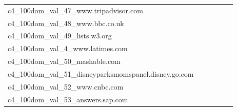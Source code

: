 {\begin{longtable}{m{6cm}m{1.7cm}m{1.7cm}m{1.7cm}m{1.7cm}m{1.7cm}}
	c4\_100dom\_val\_47\_www.tripadvisor.com  & \colorbox[HTML]{ffffe5}{\makebox[\mywidth][c]{15.80}} & \colorbox[HTML]{f7fcbb}{\makebox[\mywidth][c]{15.26}} & \colorbox[HTML]{ffffe5}{\makebox[\mywidth][c]{16.26}} & \colorbox[HTML]{d9f0a3}{\makebox[\mywidth][c]{15.10}} & \colorbox[HTML]{77c578}{\makebox[\mywidth][c]{14.93}}\\
	c4\_100dom\_val\_48\_www.bbc.co.uk  & \colorbox[HTML]{fefee3}{\makebox[\mywidth][c]{12.55}} & \colorbox[HTML]{f2fab5}{\makebox[\mywidth][c]{12.10}} & \colorbox[HTML]{ffffe5}{\makebox[\mywidth][c]{13.02}} & \colorbox[HTML]{daf0a4}{\makebox[\mywidth][c]{12.00}} & \colorbox[HTML]{77c578}{\makebox[\mywidth][c]{11.85}}\\
	c4\_100dom\_val\_49\_lists.w3.org  & \colorbox[HTML]{fdfedc}{\makebox[\mywidth][c]{18.75}} & \colorbox[HTML]{edf8b2}{\makebox[\mywidth][c]{18.24}} & \colorbox[HTML]{ffffe5}{\makebox[\mywidth][c]{19.89}} & \colorbox[HTML]{cae99c}{\makebox[\mywidth][c]{18.05}} & \colorbox[HTML]{77c578}{\makebox[\mywidth][c]{17.84}}\\
	c4\_100dom\_val\_4\_www.latimes.com  & \colorbox[HTML]{fefee2}{\makebox[\mywidth][c]{11.88}} & \colorbox[HTML]{ebf7b0}{\makebox[\mywidth][c]{11.46}} & \colorbox[HTML]{ffffe5}{\makebox[\mywidth][c]{12.40}} & \colorbox[HTML]{d7efa2}{\makebox[\mywidth][c]{11.39}} & \colorbox[HTML]{77c578}{\makebox[\mywidth][c]{11.24}}\\
	c4\_100dom\_val\_50\_mashable.com  & \colorbox[HTML]{fefee3}{\makebox[\mywidth][c]{12.44}} & \colorbox[HTML]{e7f5ad}{\makebox[\mywidth][c]{11.95}} & \colorbox[HTML]{ffffe5}{\makebox[\mywidth][c]{12.85}} & \colorbox[HTML]{d7efa2}{\makebox[\mywidth][c]{11.90}} & \colorbox[HTML]{77c578}{\makebox[\mywidth][c]{11.76}}\\
	c4\_100dom\_val\_51\_disneyparksmomspanel.disney.go.com  & \colorbox[HTML]{ffffe5}{\makebox[\mywidth][c]{11.99}} & \colorbox[HTML]{f9fcc6}{\makebox[\mywidth][c]{11.29}} & \colorbox[HTML]{ffffe5}{\makebox[\mywidth][c]{11.98}} & \colorbox[HTML]{e2f3a9}{\makebox[\mywidth][c]{11.16}} & \colorbox[HTML]{77c578}{\makebox[\mywidth][c]{11.00}}\\
	c4\_100dom\_val\_52\_www.cnbc.com  & \colorbox[HTML]{fefee3}{\makebox[\mywidth][c]{10.65}} & \colorbox[HTML]{f7fcba}{\makebox[\mywidth][c]{10.32}} & \colorbox[HTML]{ffffe5}{\makebox[\mywidth][c]{10.99}} & \colorbox[HTML]{e1f3a9}{\makebox[\mywidth][c]{10.24}} & \colorbox[HTML]{77c578}{\makebox[\mywidth][c]{10.10}}\\
	c4\_100dom\_val\_53\_answers.sap.com  & \colorbox[HTML]{fafdcd}{\makebox[\mywidth][c]{23.59}} & \colorbox[HTML]{e6f5ad}{\makebox[\mywidth][c]{23.09}} & \colorbox[HTML]{ffffe5}{\makebox[\mywidth][c]{25.71}} & \colorbox[HTML]{dcf1a5}{\makebox[\mywidth][c]{22.99}} & \colorbox[HTML]{77c578}{\makebox[\mywidth][c]{22.55}}\\

\end{longtable}}
